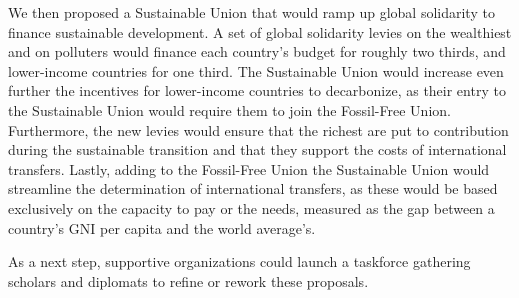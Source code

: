\documentclass[12pt,english]{article}
\begin{document}
We then proposed a Sustainable Union that would ramp up global solidarity to finance sustainable development. A set of global solidarity levies on the wealthiest and on polluters would finance each country's budget for roughly two thirds, and lower-income countries for one third. 
The Sustainable Union would increase even further the incentives for lower-income countries to decarbonize, as their entry to the Sustainable Union would require them to join the Fossil-Free Union. Furthermore, the new levies would ensure that the richest are put to contribution during the sustainable transition and that they support the costs of international transfers. Lastly, adding to the Fossil-Free Union the Sustainable Union would streamline the determination of international transfers, as these would be based exclusively on the capacity to pay or the needs, measured as the gap between a country's GNI per capita and the world average's.

As a next step, supportive organizations could launch a taskforce gathering scholars and diplomats to refine or rework these proposals.

\clearpage
\renewcommand{\url}[1]{\href{#1}{Link}} %


\appendix



\end{document}
